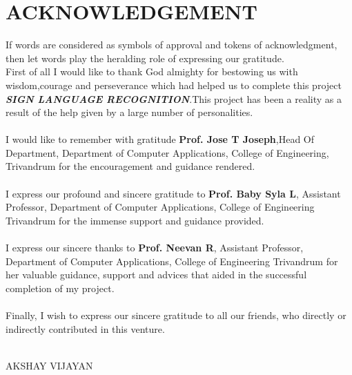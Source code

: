 \chapter*{\rm \large \bf ACKNOWLEDGEMENT}
\vspace{4.0mm}
\setlength{\parindent}{1cm} 


\indent If words are considered as symbols of approval and tokens of acknowledgment, then let words play the heralding role of expressing our gratitude.\\
\indent First of all I would like to thank God almighty for bestowing us with wisdom,courage and perseverance which had helped us to complete this project \textbf{\textit{SIGN LANGUAGE RECOGNITION}}.This project has been a reality as a result of the help given by a large number of personalities.\\ \\
\indent I would like to remember with gratitude \textbf{Prof. Jose T Joseph},Head Of Department, Department of Computer Applications, College of Engineering, Trivandrum for the encouragement and guidance rendered.\\ \\
\indent I express our profound and sincere gratitude to \textbf{Prof. Baby Syla L}, Assistant Professor, Department of Computer Applications, College of Engineering Trivandrum for the immense support and guidance provided.\\ \\
\indent I express our sincere thanks to \textbf{Prof. Neevan R}, Assistant Professor, Department of Computer Applications, College of Engineering Trivandrum for her valuable guidance, support and advices that aided in the successful completion of my project.\\ \\
\indent Finally, I wish to express our sincere gratitude to all our friends, who directly or indirectly contributed in this venture. \\ \\




\begin{flushright}
AKSHAY VIJAYAN
\end{flushright}
\newpage

